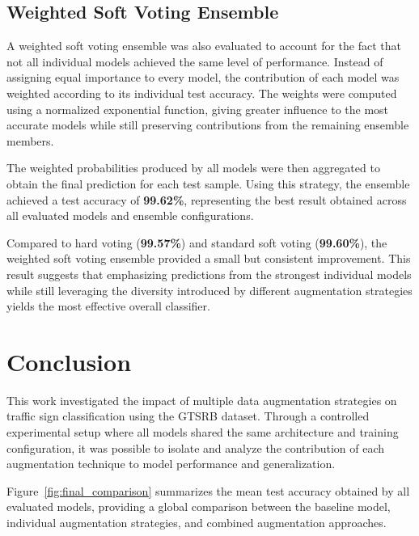 \documentclass[conference]{IEEEtran}
\begin{document}
\subsection{Weighted Soft Voting Ensemble}

A weighted soft voting ensemble was also evaluated to account for the fact that not all individual models achieved the same level of performance. Instead of assigning equal importance to every model, the contribution of each model was weighted according to its individual test accuracy. The weights were computed using a normalized exponential function, giving greater influence to the most accurate models while still preserving contributions from the remaining ensemble members.

The weighted probabilities produced by all models were then aggregated to obtain the final prediction for each test sample. Using this strategy, the ensemble achieved a test accuracy of \textbf{99.62\%}, representing the best result obtained across all evaluated models and ensemble configurations.

Compared to hard voting (\textbf{99.57\%}) and standard soft voting (\textbf{99.60\%}), the weighted soft voting ensemble provided a small but consistent improvement. This result suggests that emphasizing predictions from the strongest individual models while still leveraging the diversity introduced by different augmentation strategies yields the most effective overall classifier.















\section{Conclusion}

This work investigated the impact of multiple data augmentation strategies on traffic sign classification using the GTSRB dataset. Through a controlled experimental setup where all models shared the same architecture and training configuration, it was possible to isolate and analyze the contribution of each augmentation technique to model performance and generalization.

Figure~\ref{fig:final_comparison} summarizes the mean test accuracy obtained by all evaluated models, providing a global comparison between the baseline model, individual augmentation strategies, and combined augmentation approaches.
\end{document}
